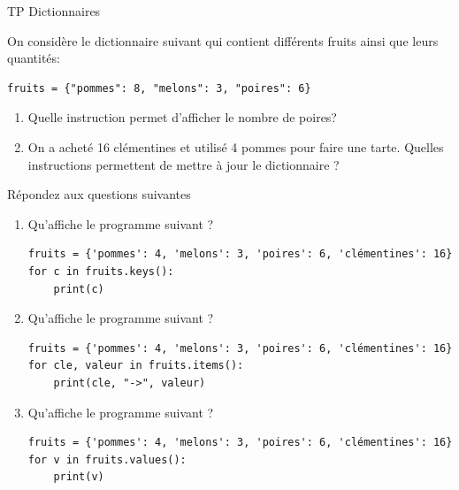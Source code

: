 \documentclass[a4paper,12pt,openany]{book}
\begin{document}
\begin{center}\begin{huge}
TP Dictionnaires
\end{huge}\end{center}

\exo 

On considère le dictionnaire suivant qui contient différents fruits ainsi que leurs quantités:

\begin{lstlisting}[numbers = none]
fruits = {"pommes": 8, "melons": 3, "poires": 6}
\end{lstlisting}

\begin{enumerate}
	\item Quelle instruction permet d'afficher le nombre de poires? \dotfill
	
	\medskip
	
	\item On a acheté 16 clémentines et utilisé 4 pommes pour faire une tarte. Quelles instructions permettent de mettre à jour le dictionnaire ? \dotfill
	
	\medskip
	
	
\end{enumerate}

\bigskip

\exo Répondez aux questions suivantes

\begin{enumerate}
	\item Qu'affiche le programme suivant ?
	\begin{lstlisting}[numbers = none]
fruits = {'pommes': 4, 'melons': 3, 'poires': 6, 'clémentines': 16}
for c in fruits.keys():
    print(c)
\end{lstlisting}

	\item Qu'affiche le programme suivant ?

\begin{lstlisting}[numbers = none]
fruits = {'pommes': 4, 'melons': 3, 'poires': 6, 'clémentines': 16}
for cle, valeur in fruits.items():
    print(cle, "->", valeur)
\end{lstlisting}

	\item Qu'affiche le programme suivant ?


\begin{lstlisting}[numbers = none]
fruits = {'pommes': 4, 'melons': 3, 'poires': 6, 'clémentines': 16}
for v in fruits.values():
    print(v)
\end{lstlisting}
\end{enumerate}
\end{document}
